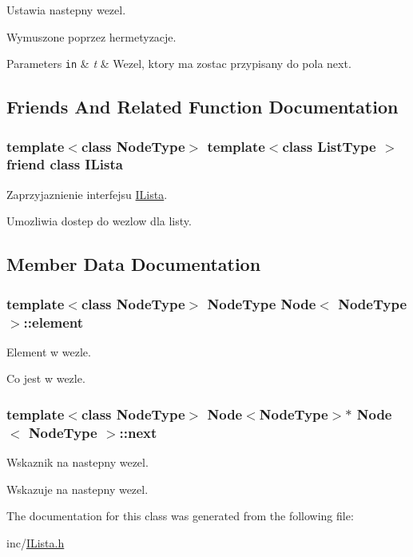 Ustawia nastepny wezel. 

Wymuszone poprzez hermetyzacje.


\begin{DoxyParams}[1]{Parameters}
\mbox{\tt in}  & {\em t} & Wezel, ktory ma zostac przypisany do pola next. \\
\hline
\end{DoxyParams}


\subsection{Friends And Related Function Documentation}
\hypertarget{class_node_acf8340255f3eca607a6c72f6d9a81dfb}{
\subsubsection[{I\-Lista}]{\setlength{\rightskip}{0pt plus 5cm}template$<$class Node\-Type$>$ template$<$class List\-Type $>$ friend class {\bf I\-Lista}\hspace{0.3cm}{\ttfamily [friend]}}}\label{class_node_acf8340255f3eca607a6c72f6d9a81dfb}


Zaprzyjaznienie interfejsu \hyperlink{class_i_lista}{I\-Lista}. 

Umozliwia dostep do wezlow dla listy. 

\subsection{Member Data Documentation}
\hypertarget{class_node_a7ae3a8a0cf4c0d490402599bd5d11c88}{
\subsubsection[{element}]{\setlength{\rightskip}{0pt plus 5cm}template$<$class Node\-Type$>$ Node\-Type {\bf Node}$<$ Node\-Type $>$\-::element}}\label{class_node_a7ae3a8a0cf4c0d490402599bd5d11c88}


Element w wezle. 

Co jest w wezle. \hypertarget{class_node_aa95538a7c96479172f550fefc6cc0074}{
\subsubsection[{next}]{\setlength{\rightskip}{0pt plus 5cm}template$<$class Node\-Type$>$ {\bf Node}$<$Node\-Type$>$$\ast$ {\bf Node}$<$ Node\-Type $>$\-::next}}\label{class_node_aa95538a7c96479172f550fefc6cc0074}


Wskaznik na nastepny wezel. 

Wskazuje na nastepny wezel. 

The documentation for this class was generated from the following file\-:\begin{DoxyCompactItemize}
\item 
inc/\hyperlink{_i_lista_8h}{I\-Lista.\-h}\end{DoxyCompactItemize}
